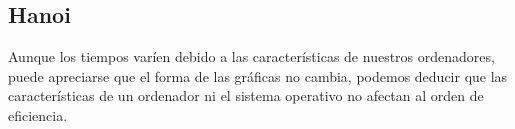 \documentclass{article}
\begin{document}
\begin{figure}[H]
	\centering
\end{figure}

\subsection{Hanoi}

\begin{figure}[H]
	\centering
\end{figure}

\begin{flushleft}
  Aunque los tiempos varíen debido a las características de nuestros
  ordenadores, puede apreciarse que el forma de las gráficas no
  cambia, podemos deducir que las características de un ordenador ni
  el sistema operativo no afectan al orden de eficiencia.
\end{flushleft}
\end{document}
